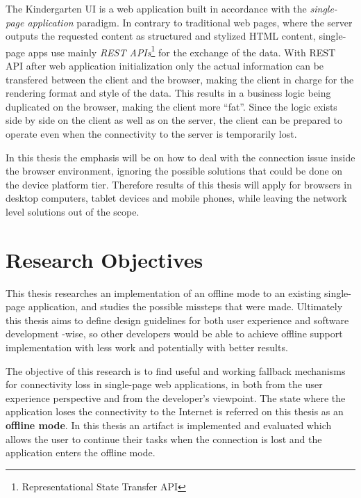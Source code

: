 The Kindergarten UI is a web application built in accordance with the \textit{single-page application} paradigm. In contrary to traditional web pages, where the server outputs the requested content as structured and stylized HTML content, single-page apps use mainly \textit{REST APIs}\footnote{Representational State Transfer API} for the exchange of the data. With REST API after web application initialization only the actual information can be transfered between the client and the browser, making the client in charge for the rendering format and style of the data. This results in a business logic being duplicated on the browser, making the client more ``fat''. Since the logic exists side by side on the client as well as on the server, the client can be prepared to operate even when the connectivity to the server is temporarily lost.

In this thesis the emphasis will be on how to deal with the connection issue inside the browser environment, ignoring the possible solutions that could be done on the device platform tier. Therefore results of this thesis will apply for browsers in desktop computers, tablet devices and mobile phones, while leaving the network level solutions out of the scope.






\section{Research Objectives}
This thesis researches an implementation of an offline mode to an existing single-page application, and studies the possible missteps that were made. Ultimately this thesis aims to define design guidelines for both user experience and software development -wise, so other developers would be able to achieve offline support implementation with less work and potentially with better results.

The objective of this research is to find useful and working fallback mechanisms for connectivity loss in single-page web applications, in both from the user experience perspective and from the developer's viewpoint. The state where the application loses the connectivity to the Internet is referred on this thesis as an \textbf{offline mode}. In this thesis an artifact is implemented and evaluated which allows the user to continue their tasks when the connection is lost and the application enters the offline mode.

